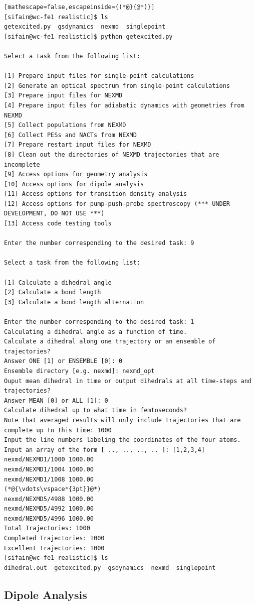 \documentclass[letterpaper,12pt,titlepage]{article}
\begin{document}
\begin{lstlisting}[mathescape=false,escapeinside={(*@}{@*)}]
[sifain@wc-fe1 realistic]$ ls
getexcited.py  gsdynamics  nexmd  singlepoint
[sifain@wc-fe1 realistic]$ python getexcited.py 

Select a task from the following list:

[1] Prepare input files for single-point calculations
[2] Generate an optical spectrum from single-point calculations
[3] Prepare input files for NEXMD
[4] Prepare input files for adiabatic dynamics with geometries from NEXMD
[5] Collect populations from NEXMD
[6] Collect PESs and NACTs from NEXMD
[7] Prepare restart input files for NEXMD
[8] Clean out the directories of NEXMD trajectories that are incomplete
[9] Access options for geometry analysis
[10] Access options for dipole analysis
[11] Access options for transition density analysis
[12] Access options for pump-push-probe spectroscopy (*** UNDER DEVELOPMENT, DO NOT USE ***)
[13] Access code testing tools

Enter the number corresponding to the desired task: 9

Select a task from the following list:

[1] Calculate a dihedral angle
[2] Calculate a bond length
[3] Calculate a bond length alternation

Enter the number corresponding to the desired task: 1
Calculating a dihedral angle as a function of time.
Calculate a dihedral along one trajectory or an ensemble of trajectories? 
Answer ONE [1] or ENSEMBLE [0]: 0
Ensemble directory [e.g. nexmd]: nexmd_opt
Ouput mean dihedral in time or output dihedrals at all time-steps and trajectories? 
Answer MEAN [0] or ALL [1]: 0
Calculate dihedral up to what time in femtoseconds?
Note that averaged results will only include trajectories that are complete up to this time: 1000
Input the line numbers labeling the coordinates of the four atoms.
Input an array of the form [ .., .., .., .. ]: [1,2,3,4]
nexmd/NEXMD1/1000 1000.00
nexmd/NEXMD1/1004 1000.00
nexmd/NEXMD1/1008 1000.00
(*@{\vdots\vspace*{3pt}}@*)
nexmd/NEXMD5/4988 1000.00
nexmd/NEXMD5/4992 1000.00
nexmd/NEXMD5/4996 1000.00
Total Trajectories: 1000
Completed Trajectories: 1000
Excellent Trajectories: 1000
[sifain@wc-fe1 realistic]$ ls
dihedral.out  getexcited.py  gsdynamics  nexmd  singlepoint
\end{lstlisting}

\newpage
\subsection{Dipole Analysis}
\label{dipanalysis}
\end{document}
